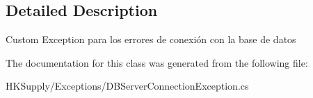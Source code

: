 \subsection{Detailed Description}
Custom Exception para los errores de conexión con la base de datos 



The documentation for this class was generated from the following file\+:\begin{DoxyCompactItemize}
\item 
H\+K\+Supply/\+Exceptions/D\+B\+Server\+Connection\+Exception.\+cs\end{DoxyCompactItemize}
